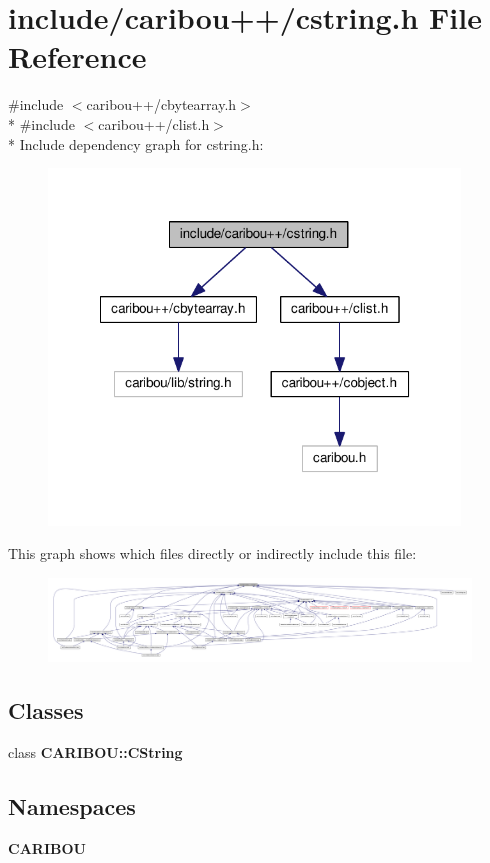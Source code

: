 \section{include/caribou++/cstring.h File Reference}
\label{cstring_8h}
{\ttfamily \#include $<$caribou++/cbytearray.\-h$>$}\\*
{\ttfamily \#include $<$caribou++/clist.\-h$>$}\\*
Include dependency graph for cstring.\-h\-:\nopagebreak
\begin{figure}[H]
\begin{center}
\leavevmode
\includegraphics[width=310pt]{cstring_8h__incl}
\end{center}
\end{figure}
This graph shows which files directly or indirectly include this file\-:\nopagebreak
\begin{figure}[H]
\begin{center}
\leavevmode
\includegraphics[width=350pt]{cstring_8h__dep__incl}
\end{center}
\end{figure}
\subsection*{Classes}
\begin{DoxyCompactItemize}
\item 
class {\bf C\-A\-R\-I\-B\-O\-U\-::\-C\-String}
\end{DoxyCompactItemize}
\subsection*{Namespaces}
\begin{DoxyCompactItemize}
\item 
{\bf C\-A\-R\-I\-B\-O\-U}
\end{DoxyCompactItemize}
